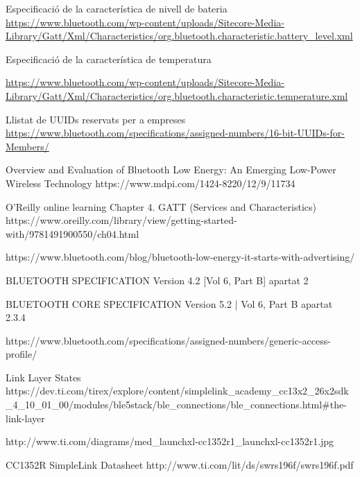\begin{thebibliography}{2}
Especificació de la característica de nivell de bateria
\href{https://www.bluetooth.com/wp-content/uploads/Sitecore-Media-Library/Gatt/Xml/Characteristics/org.bluetooth.characteristic.battery\_level.xml}{https://www.bluetooth.com/wp-content/uploads/Sitecore-Media-Library/Gatt/Xml/Characteristics/org.bluetooth.characteristic.battery\_level.xml}

Especificació de la característica de temperatura

\href{https://www.bluetooth.com/wp-content/uploads/Sitecore-Media-Library/Gatt/Xml/Characteristics/org.bluetooth.characteristic.temperature.xml}{https://www.bluetooth.com/wp-content/uploads/Sitecore-Media-Library/Gatt/Xml/Characteristics/org.bluetooth.characteristic.temperature.xml}

Llistat de UUIDs reservats per a empreses
\href{https://www.bluetooth.com/specifications/assigned-numbers/16-bit-UUIDs-for-Members/}{https://www.bluetooth.com/specifications/assigned-numbers/16-bit-UUIDs-for-Members/}

Overview and Evaluation of Bluetooth Low Energy: An Emerging Low-Power Wireless Technology
https://www.mdpi.com/1424-8220/12/9/11734

O’Reilly online learning
Chapter 4. GATT (Services and Characteristics)
https://www.oreilly.com/library/view/getting-started-with/9781491900550/ch04.html

https://www.bluetooth.com/blog/bluetooth-low-energy-it-starts-with-advertising/

BLUETOOTH SPECIFICATION Version 4.2 [Vol 6, Part B] apartat 2

BLUETOOTH CORE SPECIFICATION Version 5.2 | Vol 6, Part B apartat 2.3.4

https://www.bluetooth.com/specifications/assigned-numbers/generic-access-profile/

Link Layer States
https://dev.ti.com/tirex/explore/content/simplelink\_academy\_cc13x2\_26x2sdk\_4\_10\_01\_00/modules/ble5stack/ble\_connections/ble\_connections.html#the-link-layer

http://www.ti.com/diagrams/med\_launchxl-cc1352r1\_launchxl-cc1352r1.jpg

CC1352R SimpleLink Datasheet
http://www.ti.com/lit/ds/swrs196f/swrs196f.pdf


\end{thebibliography}

